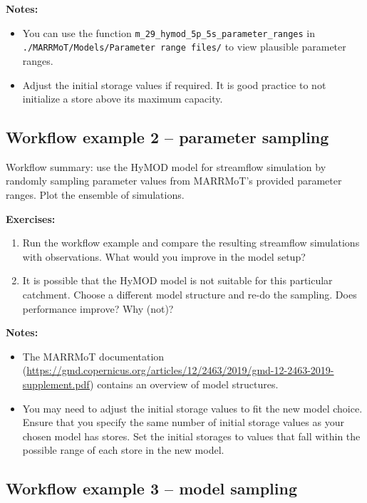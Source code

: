 \documentclass[12pt]{article}
\begin{document}
\medskip \noindent
\textbf{Notes:}
\begin{itemize}
	\item You can use the function \texttt{m\_29\_hymod\_5p\_5s\_parameter\_ranges} in \texttt{./MARRMoT/Models/Parameter range files/} to view plausible parameter ranges.
	\item Adjust the initial storage values if required. It is good practice to not initialize a store above its maximum capacity.
\end{itemize}


%
\subsection{Workflow example 2 – parameter sampling}

Workflow summary: use the HyMOD model for streamflow simulation by randomly sampling parameter values from MARRMoT’s provided parameter ranges. Plot the ensemble of simulations.

\medskip \noindent
\textbf{Exercises:}
\begin{enumerate}
	\item Run the workflow example and compare the resulting streamflow simulations with observations. What would you improve in the model setup?
	\item It is possible that the HyMOD model is not suitable for this particular catchment. Choose a different model structure and re-do the sampling. Does performance improve? Why (not)?
\end{enumerate}

\medskip \noindent
\textbf{Notes:}
\begin{itemize}
	\item The MARRMoT documentation (\url{https://gmd.copernicus.org/articles/12/2463/2019/gmd-12-2463-2019-supplement.pdf}) contains an overview of model structures.
	\item You may need to adjust the initial storage values to fit the new model choice. Ensure that you specify the same number of initial storage values as your chosen model has stores. Set the initial storages to values that fall within the possible range of each store in the new model.
\end{itemize}


%
\subsection{Workflow example 3 – model sampling}
\end{document}
